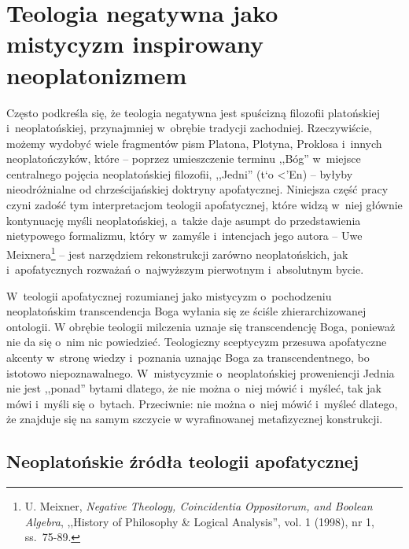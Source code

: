 

\chapter{Teologia negatywna jako mistycyzm inspirowany neoplatonizmem}\label{neopl}

Często podkreśla się, że teologia negatywna jest spuścizną filozofii platońskiej i~neoplatońskiej, przynajmniej w~obrębie tradycji zachodniej. Rzeczywiście, możemy wydobyć wiele fragmentów pism Platona, Plotyna, Proklosa i~innych neoplatończyków, które -- poprzez umieszczenie terminu ,,Bóg'' w~miejsce centralnego pojęcia neoplatońskiej filozofii, ,,Jedni'' (\textgreek{t`o <'En}) -- byłyby nieodróżnialne od chrześcijańskiej doktryny apofatycznej. Niniejsza część pracy czyni zadość tym interpretacjom teologii apofatycznej, które widzą w~niej głównie kontynuację myśli neoplatońskiej, a~także daje asumpt do przedstawienia nietypowego formalizmu, który w~zamyśle i~intencjach jego autora -- Uwe Meixnera\footnote{U. Meixner, \textit{Negative Theology, Coincidentia Oppositorum, and Boolean Algebra}, ,,History of Philosophy \& Logical Analysis'', vol. 1 (1998), nr 1, ss.~75-89.} -- jest narzędziem rekonstrukcji zarówno neoplatońskich, jak i~apofatycznych rozważań o~najwyższym pierwotnym i~absolutnym bycie.

W~teologii apofatycznej rozumianej jako mistycyzm o~pochodzeniu neoplatońskim transcendencja Boga wyłania się ze ściśle zhierarchizowanej ontologii. W obrębie teologii milczenia uznaje się transcendencję Boga, ponieważ nie da się o~nim nic powiedzieć. Teologiczny sceptycyzm przesuwa apofatyczne akcenty w~stronę wiedzy i~poznania uznając Boga za transcendentnego, bo istotowo niepoznawalnego. W~mistycyzmie o~neoplatońskiej proweniencji Jednia nie jest ,,ponad'' bytami dlatego, że nie można o~niej mówić i~myśleć, tak jak mówi i~myśli się o~bytach. Przeciwnie: nie można o~niej mówić i~myśleć dlatego, że znajduje się na samym szczycie w wyrafinowanej metafizycznej konstrukcji.


\section{Neoplatońskie źródła teologii apofatycznej}

